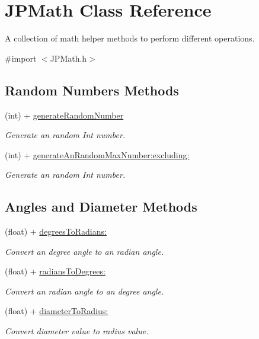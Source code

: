 \hypertarget{interface_j_p_math}{
\section{JPMath Class Reference}
\label{interface_j_p_math}
}


A collection of math helper methods to perform different operations.  




{\ttfamily \#import $<$JPMath.h$>$}

\subsection*{Random Numbers Methods}
\begin{DoxyCompactItemize}
\item 
(int) + \hyperlink{interface_j_p_math_a3271deb629cc152722aabb43bb749b80}{generateRandomNumber}
\begin{DoxyCompactList}\small\item\em Generate an random Int number. \item\end{DoxyCompactList}\item 
(int) + \hyperlink{interface_j_p_math_afdd0777fd27b0ff9787bf4e09822c769}{generateAnRandomMaxNumber:excluding:}
\begin{DoxyCompactList}\small\item\em Generate an random Int number. \item\end{DoxyCompactList}\end{DoxyCompactItemize}
\subsection*{Angles and Diameter Methods}
\begin{DoxyCompactItemize}
\item 
(float) + \hyperlink{interface_j_p_math_aa356b5edaf9ec72b7929071612ca2bc3}{degreesToRadians:}
\begin{DoxyCompactList}\small\item\em Convert an degree angle to an radian angle. \item\end{DoxyCompactList}\item 
(float) + \hyperlink{interface_j_p_math_a68d0c7874a7899db9ad4fe82bd35b088}{radiansToDegrees:}
\begin{DoxyCompactList}\small\item\em Convert an radian angle to an degree angle. \item\end{DoxyCompactList}\item 
(float) + \hyperlink{interface_j_p_math_a0a765cfa2822265d1cf34741c1225a66}{diameterToRadius:}
\begin{DoxyCompactList}\small\item\em Convert diameter value to radius value. \item\end{DoxyCompactList}\end{DoxyCompactItemize}


